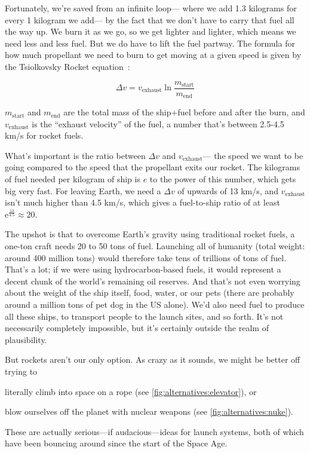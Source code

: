 Fortunately, we're saved from an infinite loop---%
where we add 1.3 kilograms for every 1 kilogram we add---%
by the fact that we don't have to carry that fuel all the way up.
We burn it as we go, so we get lighter and lighter,
which means we need less and less fuel.
But we do have to lift the fuel partway.
The formula for how much propellant we need to burn to get moving
at a given speed is given by the Tsiolkovsky Rocket equation~\cite{weisstein}:

\begin{equation*}
\Delta v = v_\text{exhaust} \ln \frac {m_\text{start}} {m_\text{end}}
\end{equation*}

$m_\text{start}$ and $m_\text{end}$
are the total mass of the ship+fuel before and after the burn,
and $v_\text{exhaust}$ is the ``exhaust velocity'' of the fuel,
a number that's between 2.5-4.5 km/s for rocket fuels.

What's important is the ratio between $\Delta v$ and $v_\text{exhaust}$---%
the speed we want to be going compared to the speed that the propellant exits our rocket.
The kilograms of fuel needed per kilogram of ship is $e$ to the power of this number,
which gets big very fast.
For leaving Earth, we need a $\Delta v$ of upwards of 13 km/s,
and $v_\text{exhaust}$ isn't much higher than 4.5 km/s,
which gives a fuel-to-ship ratio of at least $\text{e}^{\frac{13}{4.5}} \approx 20$.

The upshot is that to overcome Earth's gravity using traditional rocket fuels,
a one-ton craft needs 20 to 50 tons of fuel.
Launching all of humanity (total weight: around 400 million tons)
would therefore take tens of trillions of tons of fuel.
That's a lot; if we were using hydrocarbon-based fuels,
it would represent a decent chunk of the world's remaining oil reserves.
And that's not even worrying about the weight of the ship itself, food, water, or our pets
(there are probably around a million tons of pet dog in the US alone).
We'd also need fuel to produce all these ships,
to transport people to the launch sites, and so forth.
It's not necessarily completely impossible,
but it's certainly outside the realm of plausibility.

But rockets aren't our only option.
As crazy as it sounds, we might be better off trying to
%
\begin{enumerate*}[label=(\arabic*)]
\item literally climb into space on a rope
      (see \cref{fig:alternatives:elevator}), or
\item blow ourselves off the planet with nuclear weapons
      (see \cref{fig:alternatives:nuke}).
\end{enumerate*}
%
These are actually serious---if audacious---ideas for launch systems,
both of which have been bouncing around since the start of the Space Age.

